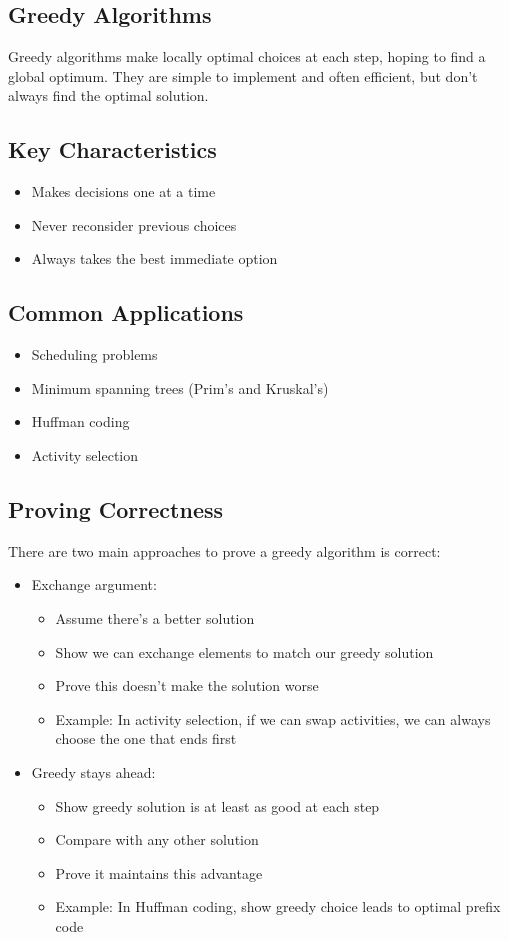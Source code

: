 \documentclass[11pt,a4paper]{article}
\begin{document}
\begin{multicols}{2}
\section{Greedy Algorithms}
Greedy algorithms make locally optimal choices at each step, hoping to find a global optimum. They are simple to implement and often efficient, but don't always find the optimal solution.

\subsection{Key Characteristics}
\begin{itemize}
    \item Makes decisions one at a time
    \item Never reconsider previous choices
    \item Always takes the best immediate option
\end{itemize}

\subsection{Common Applications}
\begin{itemize}
    \item Scheduling problems
    \item Minimum spanning trees (Prim's and Kruskal's)
    \item Huffman coding
    \item Activity selection
\end{itemize}

\subsection{Proving Correctness}
There are two main approaches to prove a greedy algorithm is correct:
\begin{itemize}
    \item Exchange argument:
    \begin{itemize}
        \item Assume there's a better solution
        \item Show we can exchange elements to match our greedy solution
        \item Prove this doesn't make the solution worse
        \item Example: In activity selection, if we can swap activities, we can always choose the one that ends first
    \end{itemize}
    \item Greedy stays ahead:
    \begin{itemize}
        \item Show greedy solution is at least as good at each step
        \item Compare with any other solution
        \item Prove it maintains this advantage
        \item Example: In Huffman coding, show greedy choice leads to optimal prefix code
    \end{itemize}
\end{itemize}


\end{multicols}
\end{document}
